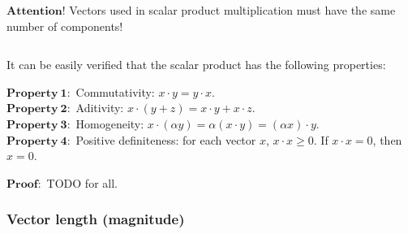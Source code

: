 \documentclass[11pt]{article}
\begin{document}
$\mathbf{Attention!}$  Vectors used in scalar product multiplication must have the same number of components!

$$$$

It can be easily verified that the scalar product has the following properties:
    
$$$$
$\mathbf{Property~1:}$ Commutativity: $x · y = y · x$.
$$$$
$\mathbf{Property~2:}$ Aditivity: $x · (y + z) = x · y + x · z$.
$$$$
$\mathbf{Property~3:}$ Homogeneity: $x · (\alpha y) = \alpha(x · y) = (\alpha x) · y$.
$$$$
$\mathbf{Property~4:}$ Positive definiteness: for each vector $x$, $x \cdot x \ge 0$. If $x \cdot x = 0$, then $x = 0$.
$$$$

$\mathbf{Proof:}$ TODO for all.

    
    \hypertarget{vector-length-magnitude}{%
\subsubsection{Vector length
(magnitude)}\label{vector-length-magnitude}}
\end{document}
